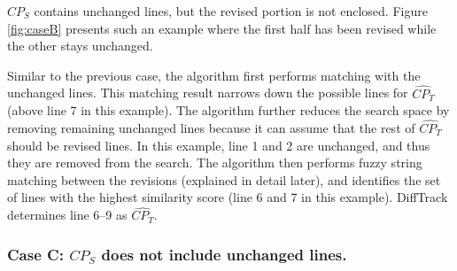     

$CP_S$ contains unchanged lines, but the revised portion is not enclosed.
Figure \ref{fig:caseB} presents such an example where the first half has been revised while the other stays unchanged.
   
Similar to the previous case, the algorithm first performs matching with the unchanged lines.
This matching result narrows down the possible lines for $\widehat{CP_T}$ (above line 7 in this example).
The algorithm further reduces the search space by removing remaining unchanged lines because it can assume that the rest of $\widehat{CP_T}$ should be revised lines.
In this example, line 1 and 2 are unchanged, and thus they are removed from the search.
The algorithm then performs fuzzy string matching between the revisions (explained in detail later), and identifies the set of lines with the highest similarity score (line 6 and 7 in this example).
DiffTrack determines line 6--9 as $\widehat{CP_T}$.


\subsubsection{Case C: $CP_S$ does not include unchanged lines.}

    
